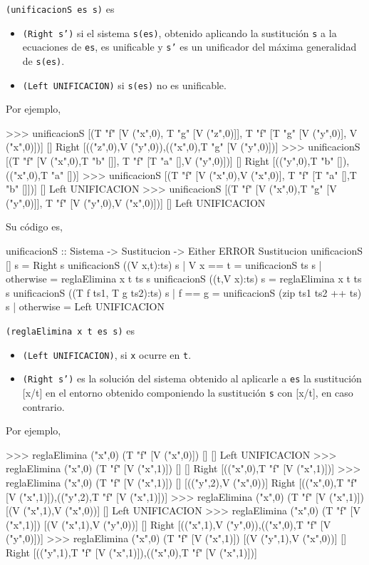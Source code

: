  \texttt{(unificacionS es s)} es
\begin{itemize}
\item \texttt{(Right s')} si el sistema \texttt{s(es)}, obtenido
  aplicando la sustitución \texttt{s} a la ecuaciones de \texttt{es},
  es unificable y \texttt{s'} es un unificador del máxima generalidad
  de \texttt{s(es)}.
\item \texttt{(Left UNIFICACION)} si \texttt{s(es)} no es unificable.
\end{itemize}
Por ejemplo,
\begin{sesion}
>>> unificacionS [(T "f" [V ("x",0), T "g" [V ("z",0)]],
                   T "f" [T "g" [V ("y",0)], V ("x",0)])]
                   []
Right [(("z",0),V ("y",0)),(("x",0),T "g" [V ("y",0)])]
>>> unificacionS [(T "f" [V ("x",0),T "b" []],
                   T "f" [T "a" [],V ("y",0)])]
                   []
Right [(("y",0),T "b" []),(("x",0),T "a" [])]
>>> unificacionS [(T "f" [V ("x",0),V ("x",0)],
                   T "f" [T "a" [],T "b" []])]
                   []
Left UNIFICACION
>>> unificacionS [(T "f" [V ("x",0),T "g" [V ("y",0)]],
                   T "f" [V ("y",0),V ("x",0)])]
                   []
Left UNIFICACION
\end{sesion}

Su código es,
\begin{codigo}
unificacionS :: Sistema -> Sustitucion -> Either ERROR Sustitucion
unificacionS [] s = Right s
unificacionS ((V x,t):ts) s 
  | V x == t  = unificacionS ts s
  | otherwise = reglaElimina x t ts s
unificacionS ((t,V x):ts) s = 
  reglaElimina x t ts s
unificacionS ((T f ts1, T g ts2):ts) s 
  | f == g    = unificacionS (zip ts1 ts2 ++ ts) s
  | otherwise = Left UNIFICACION
\end{codigo}

 \texttt{(reglaElimina x t es s)} es
\begin{itemize}
\item \texttt{(Left UNIFICACION)}, si \texttt{x} ocurre en \texttt{t}.
\item \texttt{(Right s')} es la solución del sistema obtenido al
  aplicarle a \texttt{es} la sustitución [x/t] en el entorno obtenido
  componiendo la sustitución \texttt{s} con [x/t], en caso
  contrario.
\end{itemize}
Por ejemplo,
\begin{sesion}
>>> reglaElimina ("x",0) (T "f" [V ("x",0)]) [] []
Left UNIFICACION
>>> reglaElimina ("x",0) (T "f" [V ("x",1)]) [] []
Right [(("x",0),T "f" [V ("x",1)])]
>>> reglaElimina ("x",0) (T "f" [V ("x",1)]) [] [(("y",2),V ("x",0))]
Right [(("x",0),T "f" [V ("x",1)]),(("y",2),T "f" [V ("x",1)])]
>>> reglaElimina ("x",0) (T "f" [V ("x",1)]) [(V ("x",1),V ("x",0))] []
Left UNIFICACION
>>> reglaElimina ("x",0) (T "f" [V ("x",1)]) [(V ("x",1),V ("y",0))] []
Right [(("x",1),V ("y",0)),(("x",0),T "f" [V ("y",0)])]
>>> reglaElimina ("x",0) (T "f" [V ("x",1)]) [(V ("y",1),V ("x",0))] []
Right [(("y",1),T "f" [V ("x",1)]),(("x",0),T "f" [V ("x",1)])]
\end{sesion}

